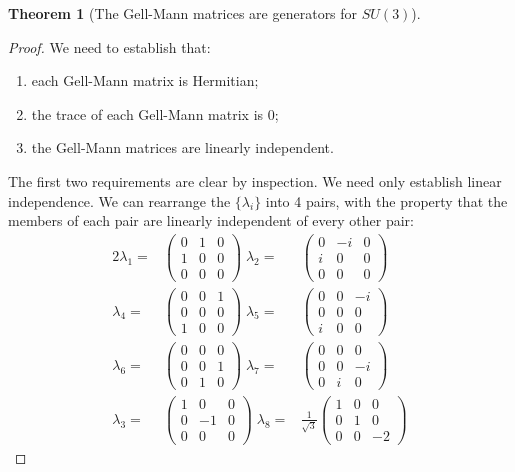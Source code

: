 \documentclass[]{article}
\newtheorem{thm}{Theorem}
\begin{document}
\begin{thm}[The Gell-Mann matrices are generators for $SU(3)$]

\end{thm}
\begin{proof}
	We need to establish that:
	\begin{enumerate}
		\item each Gell-Mann matrix is Hermitian;
		\item the trace of each Gell-Mann matrix is 0;
		\item the Gell-Mann matrices are linearly independent.
	\end{enumerate}
	The first two requirements are clear by inspection. We need only establish linear independence. We can rearrange the $\{\lambda_i\}$ into 4 pairs, with the property that the members of each pair are linearly independent of every other pair:
	\begin{alignat*}{2}
		\lambda_1=&\begin{pmatrix}
			0&1&0\\
			1&0&0\\
			0&0&0
		\end{pmatrix} \; \lambda_2=&\begin{pmatrix}
			0&-i&0\\
			i&0&0\\
			0&0&0
		\end{pmatrix}\\
		\lambda_4=&\begin{pmatrix}
			0&0&1\\
			0&0&0\\
			1&0&0
		\end{pmatrix}\;		\lambda_5=&\begin{pmatrix}
			0&0&-i\\
			0&0&0\\
			i&0&0
		\end{pmatrix}\\
		\lambda_6=&\begin{pmatrix}
			0&0&0\\
			0&0&1\\
			0&1&0
		\end{pmatrix} \;	\lambda_7=&\begin{pmatrix}
			0&0&0\\
			0&0&-i\\
			0&i&0
		\end{pmatrix}\\
		\lambda_3=&\begin{pmatrix}
			1&0&0\\
			0&-1&0\\
			0&0&0
		\end{pmatrix}\;	\lambda_8=&\frac{1}{\sqrt{3}} \begin{pmatrix}
			1&0&0\\
			0&1&0\\
			0&0&-2
		\end{pmatrix}
	\end{alignat*}
	

\end{proof}
\end{document}
